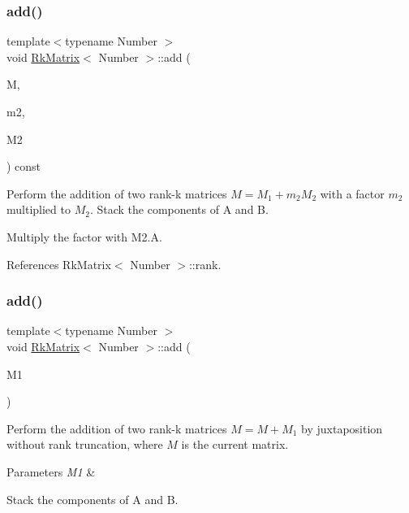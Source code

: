 \mbox{\label{classRkMatrix_a99413509ad44b1529f20cb018ce0fc70}} 
\subsubsection{\texorpdfstring{add()}{add()}\hspace{0.1cm}{\footnotesize\ttfamily [2/8]}}
{\footnotesize\ttfamily template$<$typename Number $>$ \\
void \hyperlink{classRkMatrix}{Rk\+Matrix}$<$ Number $>$\+::add (\begin{DoxyParamCaption}\item[{\hyperlink{classRkMatrix}{Rk\+Matrix}$<$ Number $>$ \&}]{M,  }\item[{const Number}]{m2,  }\item[{const \hyperlink{classRkMatrix}{Rk\+Matrix}$<$ Number $>$ \&}]{M2 }\end{DoxyParamCaption}) const}

Perform the addition of two rank-\/k matrices $M = M_1 + m_2 M_2$ with a factor $m_2$ multiplied to $M_2$. Stack the components of {\ttfamily A} and {\ttfamily B}.

Multiply the factor with {\ttfamily M2.\+A}.

References Rk\+Matrix$<$ Number $>$\+::rank.

\mbox{\label{classRkMatrix_a8793188eb93def0030ae90e8f5898813}} 
\subsubsection{\texorpdfstring{add()}{add()}\hspace{0.1cm}{\footnotesize\ttfamily [3/8]}}
{\footnotesize\ttfamily template$<$typename Number $>$ \\
void \hyperlink{classRkMatrix}{Rk\+Matrix}$<$ Number $>$\+::add (\begin{DoxyParamCaption}\item[{const \hyperlink{classRkMatrix}{Rk\+Matrix}$<$ Number $>$ \&}]{M1 }\end{DoxyParamCaption})}

Perform the addition of two rank-\/k matrices $M = M + M_1$ by juxtaposition without rank truncation, where $M$ is the current matrix. 
\begin{DoxyParams}{Parameters}
{\em M1} & \\
\hline
\end{DoxyParams}
Stack the components of {\ttfamily A} and {\ttfamily B}.


